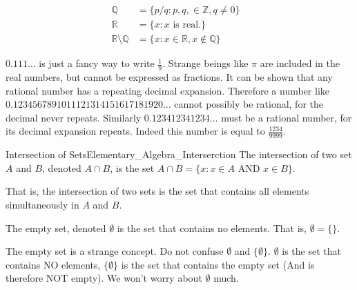 \documentclass[crop=false,class=book,oneside]{standalone}
\begin{document}
            \hfill
            \begin{minipage}[t]{0.55\textwidth}
                \centering
                \begin{align*}
                    \mathbb{Q}&=\{p/q:p,q,\in\mathbb{Z},q\ne{0}\}
                    &\tag{Rational Numbers}\\
                    \mathbb{R}&=\{x:x\textrm{ is real.}\}
                    &\tag{Real Numbers}\\
                    \mathbb{R}\setminus\mathbb{Q}
                    &=\{x:x\in\mathbb{R},x\notin\mathbb{Q}\}
                    &\tag{Irrational Numbers}
                \end{align*}
            \end{minipage}
        \begin{remark}
            $0.111\hdots$ is just a fancy way to write $\frac{1}{9}$.
            Strange beings like $\pi$ are included in the real numbers,
            but cannot be expressed as fractions. It can be shown that
            any rational number has a repeating decimal expansion.
            Therefore a number like $0.1234567891011121314151617181920\hdots$
            cannot possibly be rational, for the decimal never repeats.
            Similarly $0.123412341234\hdots$ must be a rational number,
            for its decimal expansion repeats.
            Indeed this number is equal to $\frac{1234}{9999}$.
        \end{remark}
        \begin{fdefinition}{Intersection of Sets}{Elementary_Algebra_Interserction}
            The intersection of two set $A$ and $B$, denoted $A\cap{B}$,
            is the set $A\cap{B}=\{x:x\in{A}\textrm{ AND }x\in{B}\}$.
        \end{fdefinition}
        That is, the intersection of two sets is the set that
        contains all elements simultaneously in $A$ and $B$.
        \begin{definition}
            The empty set, denoted $\emptyset$ is the set that contains
            no elements. That is, $\emptyset=\{\}$.
        \end{definition}
        \begin{remark}
            The empty set is a strange concept. Do not confuse
            $\emptyset$ and $\{\emptyset\}$. $\emptyset$ is the set that
            contains NO elements, $\{\emptyset\}$ is the set that contains
            the empty set (And is therefore NOT empty).
            We won't worry about $\emptyset$ much.
        \end{remark}
\end{document}
